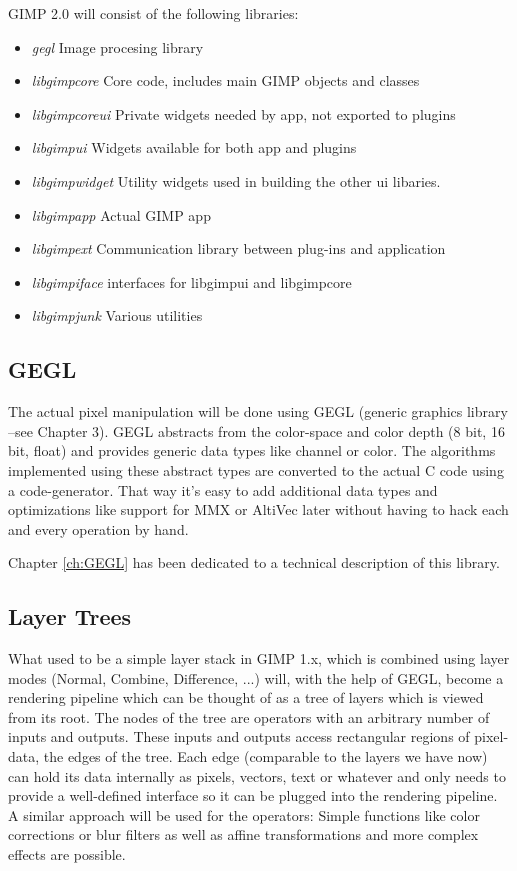 GIMP 2.0 will consist of the following libraries: 
\begin{itemize}
\item {\em gegl} Image procesing library 
\item {\em libgimpcore} Core code, includes main GIMP objects and classes  
\item {\em libgimpcoreui} Private widgets needed by app, not exported to plugins 
\item {\em libgimpui} Widgets available for both app and plugins 
\item {\em libgimpwidget} Utility widgets used in building the other ui libaries. 
\item {\em libgimpapp} Actual GIMP app
\item {\em libgimpext} Communication library between plug-ins and application
\item {\em libgimpiface} interfaces for libgimpui and libgimpcore
\item {\em libgimpjunk} Various utilities 
\end{itemize}

\subsection{GEGL}

The actual pixel manipulation will be done using GEGL (generic graphics library
--see Chapter 3). GEGL abstracts from the color-space and color depth (8 bit,
16 bit, float) and provides generic data types like channel or color.  The
algorithms implemented using these abstract types are converted to the actual C
code using a code-generator. That way it's easy to add additional data types
and optimizations like support for MMX or AltiVec later without having to hack
each and every operation by hand. 

Chapter
\ref{ch:GEGL} has been dedicated to a technical description of this library.

\subsection{Layer Trees}
 
What used to be a simple layer stack in GIMP 1.x, which is combined using layer
modes (Normal, Combine, Difference, ...) will, with the help of GEGL, become a
rendering pipeline which can be thought of as a tree of layers which is viewed
from its root. The nodes of the tree are operators with an arbitrary number of
inputs and outputs. These inputs and outputs access rectangular regions of
pixel-data, the edges of the tree. Each edge (comparable to the layers we have
now) can hold its data internally as pixels, vectors, text or whatever and only
needs to provide a well-defined interface so it can be plugged into the
rendering pipeline. A similar approach will be used for the operators: Simple
functions like color corrections or blur filters as well as affine
transformations and more complex effects are possible.


